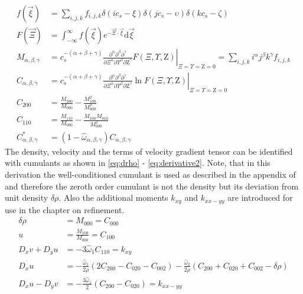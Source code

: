 \begin{align}
f(\vec{\xi}) &= \sum_{i,j,k} f_{i,j,k} \delta(ic_s - \xi) \delta(jc_s - \upsilon) \delta(kc_s - \zeta) \label{eq:contin}\\
F(\vec{\Xi}) &= \int_{-\infty}^{\infty}f(\vec{\xi})e^{-\vec{\Xi} \cdot \vec{\xi}} \mathrm{d}\vec{\xi} \label{eq:cum_laplace} \\
M_{\alpha, \beta, \gamma} &= c_s^{-(\alpha+\beta+\gamma)} \left. \frac{\partial^\alpha \partial^\beta \partial^\gamma}{\partial \Xi^\alpha \partial \Upsilon^\beta \partial \mathrm{Z}^\gamma} F(\Xi, \Upsilon, \mathrm{Z}) \right|_{\Xi=\Upsilon=\mathrm{Z}=0} = \sum_{i,j,k} i^\alpha j^\beta k^\gamma f_{i,j,k} \label{eq:moments}\\
C_{\alpha,\beta,\gamma} &= c_s^{-(\alpha+\beta+\gamma)} \left. \frac{\partial^\alpha \partial^\beta \partial^\gamma}{\partial \Xi^\alpha \partial \Upsilon^\beta \partial \mathrm{Z}^\gamma} \ln F(\Xi, \Upsilon, \mathrm{Z})\right|_{\Xi=\Upsilon=\mathrm{Z}=0} \label{eq:cum} \\
C_{200} &= \frac{M_{200}}{M_{000}} - \frac{M_{100}^2}{M_{000}^2} \label{eq:c_200}\\
C_{110} &= \frac{M_{110}}{M_{000}} - \frac{M_{100} M_{010}}{M_{000}^2} \label{eq:c_110} \\
C_{\alpha, \beta, \gamma}^* &= \left(1-\hat{\omega}_{\alpha,\beta,\gamma}\right) C_{\alpha, \beta, \gamma} \label{eq:relax}
\end{align}
The density, velocity and the terms of velocity gradient tensor can be identified with cumulants as shown in \eqref{eq:drho} - \eqref{eq:derivative2}. Note, that in this derivation the well-conditioned cumulant is used as described in the appendix of \cite{geier_cumulant_2015} and therefore the zeroth order cumulant is not the density but its deviation from unit density $\delta \rho$. Also the additional moments $k_{xy}$ and $k_{xx-yy}$ are introduced for use in the chapter on refinement.
\begin{align}
\delta \rho &= M_{000} = C_{000} \label{eq:drho}\\
u &= \frac{M_{100}}{M_{000}} =  C_{100}\\
D_x v + D_y u &= -3 \hat{\omega}_1 C_{110} = k_{xy} \label{eq:derivate1}\\
D_x u &= - \frac{\hat{\omega}_1}{2 \rho}\left(2 C_{200} - C_{020} - C_{002} \right) - \frac{\hat{\omega}_2}{2 \rho} \left(C_{200} + C_{020} + C_{002} - \delta \rho \right) \\
D_x u - D_y v &= - \frac{3\hat{\omega}_1}{2} \left(C_{200} - C_{020}\right) = k_{xx-yy}\label{eq:derivative2}
\end{align}
